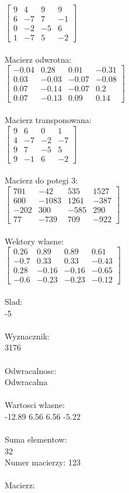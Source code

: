 \documentclass[a4paper,12pt]{article}
\begin{document}
$\begin{bmatrix} 9&4&9&9\\6&-7&7&-1\\0&-2&-5&6\\1&-7&5&-2 \end{bmatrix}$
\\
\\
Macierz odwrotna:\\

$\begin{bmatrix} -0.04&0.28&0.01&-0.31\\0.03&-0.03&-0.07&-0.08\\0.07&-0.14&-0.07&0.2\\0.07&-0.13&0.09&0.14 \end{bmatrix}$
\\
\\
Macierz transponowana:\\

$\begin{bmatrix} 9&6&0&1\\4&-7&-2&-7\\9&7&-5&5\\9&-1&6&-2 \end{bmatrix}$
\\
\\
Macierz do potegi 3:\\

$\begin{bmatrix} 701&-42&535&1527\\600&-1083&1261&-387\\-202&300&-585&290\\77&-739&709&-922 \end{bmatrix}$
\\
\\
Wektory wlasne:\\

$\begin{bmatrix} 0.26&0.89&0.89&0.61\\-0.7&0.33&0.33&-0.43\\0.28&-0.16&-0.16&-0.65\\-0.6&-0.23&-0.23&-0.12 \end{bmatrix}$
\\
\\
Slad:\\
-5
\\
\\
Wyznacznik:\\
3176
\\
\\
Odwracalnosc:\\
Odwracalna
\\
\\
Wartosci wlasne:\\
-12.89 6.56 6.56 -5.22
\\
\\
Suma elementow:\\
32
\\
\newpage
Numer macierzy:
123
\\
\\
Macierz:\\
\end{document}
